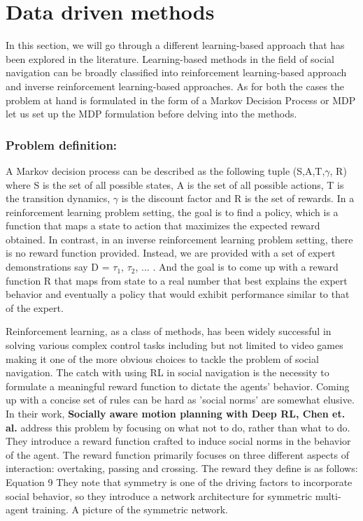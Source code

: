 \section{Data driven methods}
In this section, we will go through a different learning-based approach that has been explored in the literature. Learning-based methods in the field of social navigation can be broadly classified into reinforcement learning-based approach and inverse reinforcement learning-based approaches. As for both the cases the problem at hand is formulated in the form of a Markov Decision Process or MDP let us set up the MDP formulation before delving into the methods.

\subsubsection*{Problem definition:}
A Markov decision process can be described as the following tuple
(S,A,T,$\gamma$, R) where S is the set of all possible states, A is the set of all possible actions, T is the transition dynamics, $\gamma$ is the discount factor and R is the set of rewards. 
In a reinforcement learning problem setting, the goal is to find a policy, which is a function that maps a state to action that maximizes the expected reward obtained.
In contrast, in an inverse reinforcement learning problem setting, there is no reward function provided. Instead, we are provided with a set of expert demonstrations say D = {$\tau_1$, $\tau_2$, ... }. And the goal is to come up with a reward function R that maps from state to a real number that best explains the expert behavior and eventually a policy that would exhibit performance similar to that of the expert.



Reinforcement learning, as a class of methods, has been widely successful in solving various complex control tasks including but not limited to video games making it one of the more obvious choices to tackle the problem of social navigation. 
The catch with using RL in social navigation is the necessity to formulate a meaningful reward function to dictate the agents' behavior. Coming up with a concise set of rules can be hard as 'social norms' are somewhat elusive. In their work, \textbf{Socially aware motion planning with Deep RL, Chen et. al.} address this problem by focusing on what not to do, rather than what to do. They introduce a reward function crafted to induce social norms in the behavior of the agent.
The reward function primarily focuses on three different aspects of interaction: overtaking, passing and crossing. The reward they define is as follows:
Equation 9
They note that symmetry is one of the driving factors to incorporate social behavior, so they introduce a network architecture for symmetric multi-agent training.
A picture of the symmetric network.

